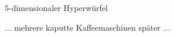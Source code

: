 \documentclass{beamer}
\begin{document}

		\begin{frame}[containsverbatim]{5-dimensionaler Hyperwürfel}
		\end{frame}


		\begin{frame}[containsverbatim]{}
			\begin{center}
				... mehrere kaputte Kaffeemaschinen später ...
			\end{center}
		\end{frame}

\end{document}
